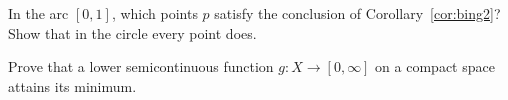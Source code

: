 \begin{exercise}
In the arc $[0,1]$, which points $p$ satisfy the conclusion of Corollary~\ref{cor:bing2}? Show that in the circle every
point does.
\end{exercise}

\begin{exercise}
Prove that a lower semicontinuous function $g\colon X\to[0,\infty]$ on a compact space attains its minimum.
\end{exercise}
